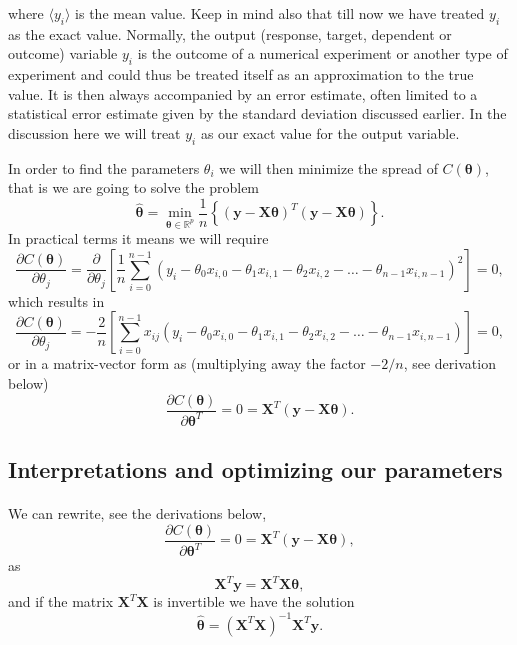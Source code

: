 \documentclass[%
oneside,                 %
final,                   %
10pt]{article}
\begin{document}
where $\langle y_i \rangle$ is the mean value. Keep in mind also that
till now we have treated $y_i$ as the exact value. Normally, the
output (response, target, dependent or outcome) variable $y_i$ is the outcome of a
numerical experiment or another type of experiment and could thus be treated itself as an
approximation to the true value. It is then always accompanied by an
error estimate, often limited to a statistical error estimate given by
the standard deviation discussed earlier. In the discussion here we
will treat $y_i$ as our exact value for the output variable.

In order to find the parameters $\theta_i$ we will then minimize the spread of $C(\bm{\theta})$, that is we are going to solve the problem
\[
\hat{\bm{\theta}}={\displaystyle \min_{\bm{\theta}\in
{\mathbb{R}}^{p}}}\frac{1}{n}\left\{\left(\bm{y}-\bm{X}\bm{\theta}\right)^T\left(\bm{y}-\bm{X}\bm{\theta}\right)\right\}.
\]
In practical terms it means we will require
\[
\frac{\partial C(\bm{\theta})}{\partial \theta_j} = \frac{\partial }{\partial \theta_j}\left[ \frac{1}{n}\sum_{i=0}^{n-1}\left(y_i-\theta_0x_{i,0}-\theta_1x_{i,1}-\theta_2x_{i,2}-\dots-\theta_{n-1}x_{i,n-1}\right)^2\right]=0, 
\]
which results in
\[
\frac{\partial C(\bm{\theta})}{\partial \theta_j} = -\frac{2}{n}\left[ \sum_{i=0}^{n-1}x_{ij}\left(y_i-\theta_0x_{i,0}-\theta_1x_{i,1}-\theta_2x_{i,2}-\dots-\theta_{n-1}x_{i,n-1}\right)\right]=0, 
\]
or in a matrix-vector form as (multiplying away the factor $-2/n$, see derivation below)
\[
\frac{\partial C(\bm{\theta})}{\partial \bm{\theta}^T} = 0 = \bm{X}^T\left( \bm{y}-\bm{X}\bm{\theta}\right).  
\]

\subsection*{Interpretations and optimizing our parameters}

\paragraph{}
We can rewrite, see the derivations below, 
\[
\frac{\partial C(\bm{\theta})}{\partial \bm{\theta}^T} = 0 = \bm{X}^T\left( \bm{y}-\bm{X}\bm{\theta}\right),  
\]
as
\[
\bm{X}^T\bm{y} = \bm{X}^T\bm{X}\bm{\theta},  
\]
and if the matrix $\bm{X}^T\bm{X}$ is invertible we have the solution
\[
\hat{\bm{\theta}} =\left(\bm{X}^T\bm{X}\right)^{-1}\bm{X}^T\bm{y}.
\]
\end{document}
